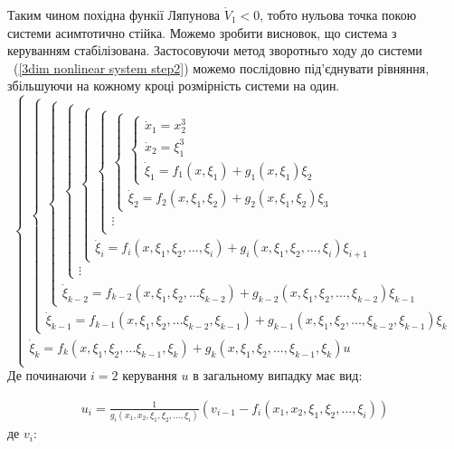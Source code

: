 \documentclass{article}
\begin{document}
Таким чином похідна функії Ляпунова $ \dot V_1 <0$, тобто нульова точка покою системи асимтотично 
стійка. Можемо зробити висновок, що система з керуванням стабілізована.
Застосовуючи метод зворотньго ходу до системи ~(\ref{3dim nonlinear system step2}) можемо послідовно під'єднувати
рівняння, збільшуючи на кожному кроці розмірність системи на один. 
\begin{equation}
{\begin{cases}
{\begin{cases}
{\begin{cases}
{\begin{cases}
{\begin{cases}
{\begin{cases}
{\begin{cases}
{\begin{cases}
\dot x_1 = x_2^3 \\
\dot x_2 = \xi_1^3\\
{\dot  {\xi}}_{1}=f_{1}(x,\xi_{1})+g_{1}(x,\xi_{1})\xi_{2}\end{cases}}\\
{\dot  {\xi}}_{2}=f_{2}(x,\xi_{1},\xi_{2})+g_{2}(x,\xi_{1},\xi_{2})\xi_{3}\end{cases}}\\\vdots \\\end{cases}}\\
{\dot  {\xi}}_{i}=f_{i}(x,\xi_{1},\xi_{2},\ldots ,\xi_{i})+g_{i}(x,\xi_{1},\xi_{2},\ldots ,\xi_{i})\xi_{{i+1}}\end{cases}}\\\vdots \end{cases}}\\
{\dot  {\xi}}_{{k-2}}=f_{{k-2}}(x,\xi_{1},\xi_{2},\ldots \xi_{{k-2}})+g_{{k-2}}(x,\xi_{1},\xi_{2},\ldots ,\xi_{{k-2}})\xi_{{k-1}}\end{cases}}\\
{\dot  {\xi}}_{{k-1}}=f_{{k-1}}(x,\xi_{1},\xi_{2},\ldots \xi_{{k-2}},\xi_{{k-1}})+g_{{k-1}}(x,\xi_{1},\xi_{2},\ldots ,\xi_{{k-2}},\xi_{{k-1}})\xi_{k}\end{cases}}\\
{\dot  {\xi}}_{k}=f_{k}(x,\xi_{1},\xi_{2},\ldots \xi_{{k-1}},\xi_{k})+g_{k}(x,\xi_{1},\xi_{2},\ldots ,\xi_{{k-1}},\xi_{k})u\\\end{cases}}
\end{equation}
Де починаючи $i=2$ керування $u$ в загальному випадку має вид:

\begin{eqnarray}
u_{i} =\frac{1}{g_{i}(x_1, x_2, \xi_1, \xi_2, \dots ,\xi_i)}
    (v_{i-1}-f_{i}(x_1, x_2, \xi_1, \xi_2, \dots ,\xi_i))
\end{eqnarray}
де $v_i$:
\end{document}

